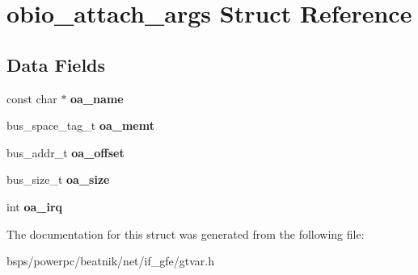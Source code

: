 \hypertarget{structobio__attach__args}{}\section{obio\+\_\+attach\+\_\+args Struct Reference}
\label{structobio__attach__args}
\subsection*{Data Fields}
\begin{DoxyCompactItemize}
\item 
\mbox{\label{structobio__attach__args_a93ff9dfb849457192c7e47a8aa296626}} 
const char $\ast$ {\bfseries oa\+\_\+name}
\item 
\mbox{\label{structobio__attach__args_a7f77e3bcd483a87f974eabbf02773835}} 
bus\+\_\+space\+\_\+tag\+\_\+t {\bfseries oa\+\_\+memt}
\item 
\mbox{\label{structobio__attach__args_a76e4ef1a107fb884f17000cade85afc5}} 
bus\+\_\+addr\+\_\+t {\bfseries oa\+\_\+offset}
\item 
\mbox{\label{structobio__attach__args_a462051dea0508dfa4a60b4db98d7dc2d}} 
bus\+\_\+size\+\_\+t {\bfseries oa\+\_\+size}
\item 
\mbox{\label{structobio__attach__args_a46d532a4c86d82172d6857e32e7cb390}} 
int {\bfseries oa\+\_\+irq}
\end{DoxyCompactItemize}


The documentation for this struct was generated from the following file\+:\begin{DoxyCompactItemize}
\item 
bsps/powerpc/beatnik/net/if\+\_\+gfe/gtvar.\+h\end{DoxyCompactItemize}
